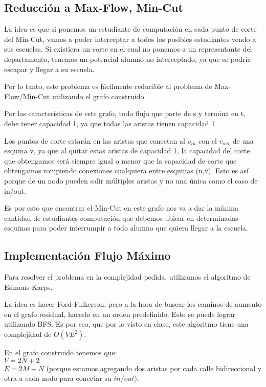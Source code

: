 \documentclass[a4paper]{article}
\begin{document}
\subsection{Reducción a Max-Flow, Min-Cut}

La idea es que si ponemos un estudiante de computación en cada punto de corte del Min-Cut, vamos a poder interceptar a todos los posibles estudiantes yendo a sus escuelas. Si existiera un corte en el cual no ponemos a un representante del departamento, tenemos un potencial alumno no interceptado, ya que se podría escapar y llegar a su escuela.

Por lo tanto, este problema es fácilmente reducible al problema de Max-Flow/Min-Cut utilizando el grafo construido.

Por las características de este grafo, todo flujo que parte de s y termina en t, debe tener capacidad 1, ya que todas las aristas tienen capacidad 1. 

Los puntos de corte estarán en las aristas que conectan al $v_{in}$ con el $v_{out}$ de una esquina v, ya que al quitar estas aristas de capacidad 1, la capacidad del corte que obtengamos será siempre igual o menor que la capacidad de corte que obtengamos rompiendo conexiones cualquiera entre esquinas (u,v). Esto es así porque de un nodo pueden salir múltiples aristas y no una única como el caso de in/out.

Es por esto que encontrar el Min-Cut en este grafo nos va a dar la mínima cantidad de estudiantes computación que debemos ubicar en determinadas esquinas para poder interrumpir a todo alumno que quiera llegar a la escuela.

\subsection{Implementación Flujo Máximo}
Para resolver el problema en la complejidad pedida, utilizamos el algoritmo de Edmons-Karps. 

La idea es hacer Ford-Fulkerson, pero a la hora de buscar los caminos de aumento en el grafo residual, hacerlo en un orden predefinido. Esto se puede lograr utilizando BFS. Es por eso, que por lo visto en clase, este algoritmo tiene una complejidad de $O(VE^2)$.

En el grafo construido tenemos que:\\

$V = 2N+2$\\ 

$E = 2M + N$ (porque estamos agregando dos aristas por cada calle bidireccional y otra a cada nodo para conectar su $in/out$). \\
\end{document}
